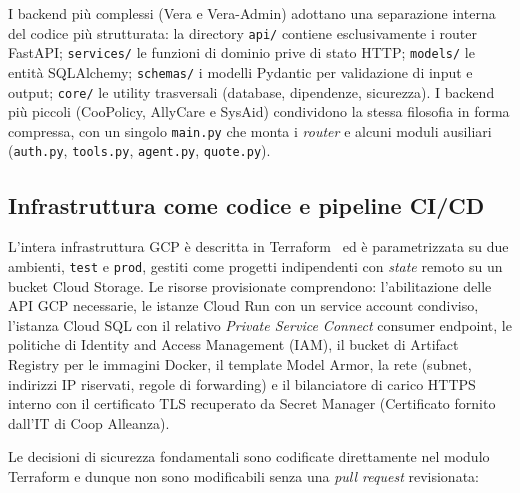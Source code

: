 I backend più complessi (Vera e Vera-Admin) adottano una separazione interna del codice
più strutturata: la directory \texttt{api/} contiene esclusivamente i router
FastAPI; \texttt{services/} le funzioni di dominio prive di stato HTTP;
\texttt{models/} le entit\`a SQLAlchemy; \texttt{schemas/} i modelli Pydantic
per validazione di input e output; \texttt{core/} le utility trasversali
(database, dipendenze, sicurezza). I backend più piccoli (CooPolicy, AllyCare e
SysAid) condividono la stessa filosofia in forma compressa, con
un singolo \texttt{main.py} che monta i \emph{router} e alcuni moduli
ausiliari (\texttt{auth.py}, \texttt{tools.py}, \texttt{agent.py}, \texttt{quote.py}).

\subsection{Infrastruttura come codice e pipeline CI/CD}
\label{subsec:agenti-iac}

L'intera infrastruttura GCP è descritta in Terraform~\cite{terraform_docs} ed è
parametrizzata su due ambienti, \texttt{test} e \texttt{prod}, gestiti come
progetti indipendenti con \emph{state} remoto su un bucket Cloud
Storage. Le risorse provisionate comprendono: l'abilitazione delle API GCP
necessarie, le istanze Cloud Run con un service account condiviso, l'istanza
Cloud SQL con il relativo \emph{Private Service Connect} consumer endpoint, le
politiche di Identity and Access Management (IAM), il bucket di Artifact
Registry per le immagini Docker, il template Model Armor, la rete (subnet,
indirizzi IP riservati, regole di forwarding) e il bilanciatore di carico HTTPS
interno con il certificato TLS recuperato da Secret Manager (Certificato fornito dall'IT di Coop Alleanza).

Le decisioni di sicurezza fondamentali sono codificate direttamente nel
modulo Terraform e dunque non sono modificabili senza una \emph{pull request}
revisionata:

